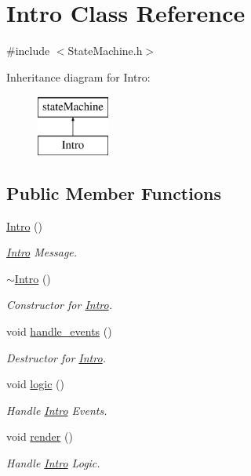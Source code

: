 \hypertarget{class_intro}{\section{Intro Class Reference}
\label{class_intro}
}


{\ttfamily \#include $<$State\-Machine.\-h$>$}

Inheritance diagram for Intro\-:\begin{figure}[H]
\begin{center}
\leavevmode
\includegraphics[height=2.000000cm]{class_intro}
\end{center}
\end{figure}
\subsection*{Public Member Functions}
\begin{DoxyCompactItemize}
\item 
\hyperlink{class_intro_a39875a338e68b4e2fba74693131ae498}{Intro} ()
\begin{DoxyCompactList}\small\item\em \hyperlink{class_intro}{Intro} Message. \end{DoxyCompactList}\item 
\hyperlink{class_intro_a024067dadaf97daca3bfeb0f22e9c183}{$\sim$\-Intro} ()
\begin{DoxyCompactList}\small\item\em Constructor for \hyperlink{class_intro}{Intro}. \end{DoxyCompactList}\item 
void \hyperlink{class_intro_ab559f39689d24f41f3bc03791241974f}{handle\-\_\-events} ()
\begin{DoxyCompactList}\small\item\em Destructor for \hyperlink{class_intro}{Intro}. \end{DoxyCompactList}\item 
void \hyperlink{class_intro_abca960766a7e6e977be5e56e59637afd}{logic} ()
\begin{DoxyCompactList}\small\item\em Handle \hyperlink{class_intro}{Intro} Events. \end{DoxyCompactList}\item 
void \hyperlink{class_intro_afa2ad2d82a78c9fbc38c1fdeeae80992}{render} ()
\begin{DoxyCompactList}\small\item\em Handle \hyperlink{class_intro}{Intro} Logic. \end{DoxyCompactList}\end{DoxyCompactItemize}


